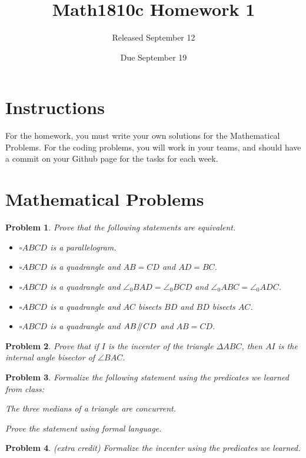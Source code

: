 \documentclass{article}
\title{Math1810c Homework 1}
\author{Released September 12}
\date{Due September 19}
\newtheorem{problem}{Problem}
\newcommand{\parallelsum}{\mathbin{\!/\mkern-5mu/\!}}
\begin{document}
\maketitle

\section{Instructions}

For the homework, you must write your own solutions for the Mathematical Problems. For the coding problems, you will work in your teams, and should have a commit on your Github page for the tasks for each week. 

\section{Mathematical Problems}

\begin{problem}
Prove that the following statements are equivalent.
\begin{itemize}
  \item $\square ABCD$ is a parallelogram.
  \item $\square ABCD$ is a quadrangle and $AB = CD$ and $AD = BC$.
  \item $\square ABCD$ is a quadrangle and $\angle_0 BAD = \angle_0 BCD$ and $\angle_0 ABC = \angle_0 ADC$.
  \item $\square ABCD$ is a quadrangle and $AC$ bisects $BD$ and $BD$ bisects $AC$.
  \item $\square ABCD$ is a quadrangle and $AB \parallelsum CD$ and $AB=CD$. 
\end{itemize}

\end{problem}

\begin{problem}
     Prove that if $I$ is the incenter of the triangle $\Delta ABC$, then $AI$ is the internal angle bisector of $\angle BAC$.
\end{problem}

\begin{problem}
    Formalize the following statement using the predicates we learned from class:
\begin{center}
The three medians of a triangle are concurrent.    
\end{center}
    Prove the statement using formal language.
\end{problem}

\begin{problem} (extra credit)
Formalize the incenter using the predicates we learned.
\end{problem}
\end{document}

